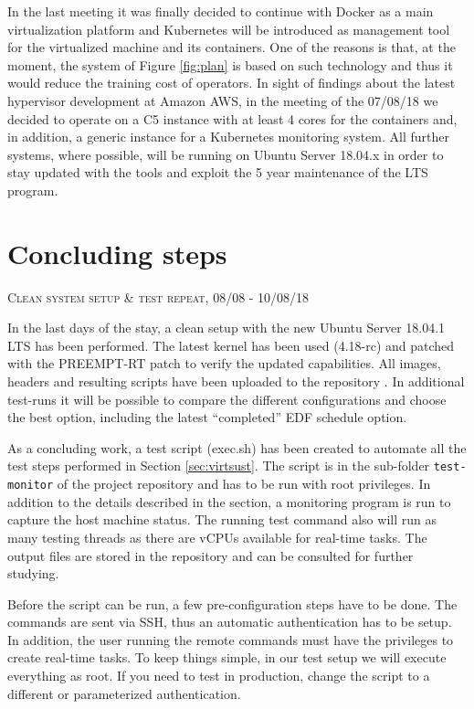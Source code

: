 \documentclass[]{scrartcl}
\begin{document}
In the last meeting it was finally decided to continue with Docker as a main virtualization platform and Kubernetes will be introduced as management tool for the virtualized machine and its containers.
One of the reasons is that, at the moment, the system of Figure \ref{fig:plan} is based on such technology and thus it would reduce the training cost of operators.
In sight of findings about the latest hypervisor development at Amazon AWS, in the meeting of the 07/08/18 we decided to operate on a C5 instance with at least 4 cores for the containers and, in addition, a generic instance for a Kubernetes monitoring system.
All further systems, where possible, will be running on Ubuntu Server 18.04.x in order to stay updated with the tools and exploit the 5 year maintenance of the LTS program.

\section{Concluding steps}

{\small\textsc{Clean system setup \& test repeat, 08/08 - 10/08/18} \bigskip}

In the last days of the stay, a clean setup with the new Ubuntu Server 18.04.1 LTS has been performed. The latest kernel has been used (4.18-rc) and patched with the PREEMPT-RT patch to verify the updated capabilities. 
All images, headers and resulting scripts have been uploaded to the repository \cite{gitrepo}. In additional test-runs it will be possible to compare the different configurations and choose the best option, including the latest ``completed'' EDF schedule option.

As a concluding work, a test script (exec.sh) has been created to automate all the test steps performed in Section \ref{sec:virtsust}. The script is in the sub-folder \texttt{test-monitor} of the project repository \cite{gitrepo} and has to be run with root privileges.
In addition to the details described in the section, a monitoring program is run to capture the host machine status. The running test command also will run as many testing threads as there are vCPUs available for real-time tasks. The output files are stored in the repository and can be consulted for further studying.

Before the script can be run, a few pre-configuration steps have to be done. The commands are sent via SSH, thus an automatic authentication has to be setup. In addition, the user running the remote commands must have the privileges to create real-time tasks.
To keep things simple, in our test setup we will execute everything as root. If you need to test in production, change the script to a different or parameterized authentication.
\bigskip
\end{document}
